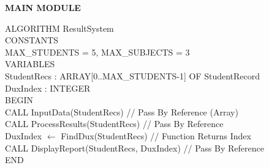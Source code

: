 \documentclass[11pt]{article}
\begin{document}
\begin{exoresolu}
\textbf{MAIN MODULE}
\begin{flushleft}
\ttfamily\small
ALGORITHM ResultSystem\\
CONSTANTS\\
\hspace{1em}MAX\_STUDENTS = 5, MAX\_SUBJECTS = 3\\
VARIABLES\\
\hspace{1em}StudentRecs : ARRAY[0..MAX\_STUDENTS-1] OF StudentRecord\\
\hspace{1em}DuxIndex : INTEGER\\
BEGIN\\
\hspace{1em}CALL InputData(StudentRecs) \hspace{2em}// Pass By Reference (Array)\\
\hspace{1em}CALL ProcessResults(StudentRecs) \hspace{1em}// Pass By Reference\\
\hspace{1em}DuxIndex $\leftarrow$ FindDux(StudentRecs) \hspace{1em}// Function Returns Index\\
\hspace{1em}CALL DisplayReport(StudentRecs, DuxIndex) \hspace{1em}// Pass By Reference\\
END
\end{flushleft}


\end{exoresolu}
\end{document}

